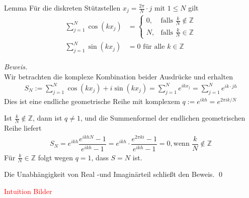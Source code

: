 \begin{colbox}{Lemma}\label{lem:diskStstelSum}
  Für die diskreten Stützstellen $x_j=\tfrac{2\pi}{N}\cdot j$ mit $1\leq N$  gilt
  \begin{align*}
    \sum_{j=1}^N \cos(kx_j) 
    &= \begin{cases}
      0, & \text{falls } \tfrac{k}{N}\notin\mathbb{Z} \\
      N, & \text{falls } \tfrac{k}{N}\in\mathbb{Z}
    \end{cases} \\
    \sum_{j=1}^N \sin(kx_j) 
    &= 0 \text{ für alle } k\in\mathbb{Z}
  \end{align*}
\end{colbox}

\textit{Beweis.}\\
Wir betrachten die komplexe Kombination beider Ausdrücke und erhalten
%
\begin{align*}
  S_N := \sum_{j=1}^{N} \cos(kx_j) + i\sin(kx_j) = \sum_{j=1}^{N} e^{ikx_j} = \sum_{j=1}^{N} e^{ik\cdot jh}
\end{align*}%
Dies ist eine endliche geometrische Reihe mit komplexem $q := e^{ikh} = e^{2\pi ik/N}$

Ist $\tfrac{k}{N}\notin\mathbb{Z}$, dann ist $q\neq 1$, und die Summenformel der endlichen geometrischen Reihe liefert 
%
\begin{align*}
   S_N 
   = e^{ikh}\dfrac{e^{ikhN}-1}{e^{ikh}-1} 
   = e^{ikh}\cdot\dfrac{e^{2\pi ki}-1}{e^{ikh}-1} 
   = 0, \text{wenn } \dfrac{k}{N}\notin\mathbb{Z}
\end{align*}
%
Für $\tfrac{k}{N}\in\mathbb{Z}$ folgt wegen $q=1$, dass $S=N$ ist. 

Die Unabhängigkeit von Real -und Imaginärteil schließt den Beweis.
\qed

\textcolor{red}{Intuition Bilder}

